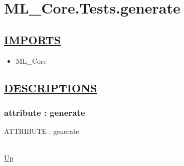 \chapter*{ML\_Core.Tests.generate}
\hypertarget{ML_Core.Tests.generate}{}

\section*{\underline{IMPORTS}}
\begin{itemize}
\item ML\_Core
\end{itemize}

\section*{\underline{DESCRIPTIONS}}
\subsection*{attribute : generate}
\hypertarget{ecldoc:ml_core.tests.generate}{ATTRIBUTE : generate} \\
\hyperlink{ecldoc:}{Up} \\
\par
